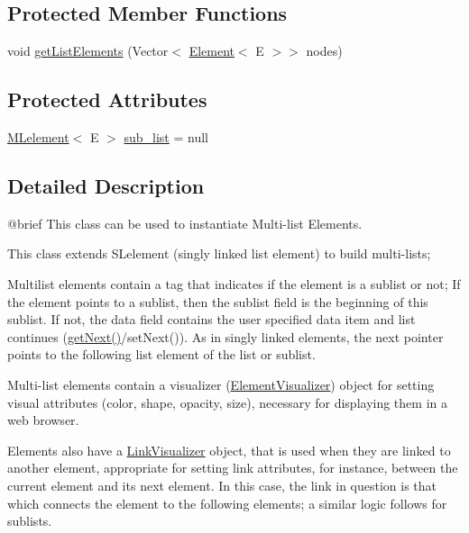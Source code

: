 \subsection*{Protected Member Functions}
\begin{DoxyCompactItemize}
\item 
void \mbox{\hyperlink{classbridges_1_1base_1_1_m_lelement_a496378739f031ef451a6ab1f63c5770f}{get\+List\+Elements}} (Vector$<$ \mbox{\hyperlink{classbridges_1_1base_1_1_element}{Element}}$<$ E $>$$>$ nodes)
\end{DoxyCompactItemize}
\subsection*{Protected Attributes}
\begin{DoxyCompactItemize}
\item 
\mbox{\hyperlink{classbridges_1_1base_1_1_m_lelement}{M\+Lelement}}$<$ E $>$ \mbox{\hyperlink{classbridges_1_1base_1_1_m_lelement_a7dee2985f9a8134d3076eb9478422403}{sub\+\_\+list}} = null
\end{DoxyCompactItemize}


\subsection{Detailed Description}
\begin{DoxyVerb}@brief This class can be used to instantiate Multi-list Elements.

This class extends SLelement (singly linked list element) to build multi-lists;
\end{DoxyVerb}
 Multilist elements contain a tag that indicates if the element is a sublist or not; If the element points to a sublist, then the sublist field is the beginning of this sublist. If not, the data field contains the user specified data item and list continues (\mbox{\hyperlink{classbridges_1_1base_1_1_m_lelement_a52ddc26a69eccda5f5b57b94cf87a545}{get\+Next()}}/set\+Next()). As in singly linked elements, the next pointer points to the following list element of the list or sublist.

Multi-\/list elements contain a visualizer (\mbox{\hyperlink{classbridges_1_1base_1_1_element_visualizer}{Element\+Visualizer}}) object for setting visual attributes (color, shape, opacity, size), necessary for displaying them in a web browser.

Elements also have a \mbox{\hyperlink{classbridges_1_1base_1_1_link_visualizer}{Link\+Visualizer}} object, that is used when they are linked to another element, appropriate for setting link attributes, for instance, between the current element and its next element. In this case, the link in question is that which connects the element to the following elements; a similar logic follows for sublists.

